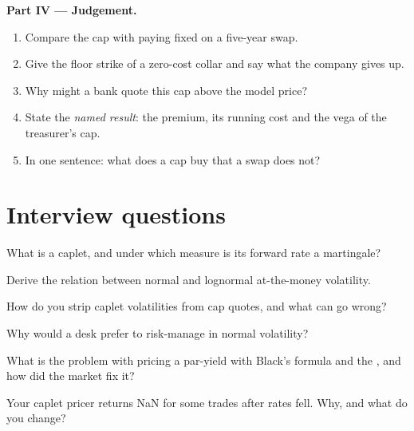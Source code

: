 \begin{problem}
\medskip\noindent\textbf{Part IV --- Judgement.}
\begin{enumerate}[resume]
\item Compare the cap with paying fixed on a five-year swap.
\item Give the floor strike of a zero-cost collar and say what the company gives
up.
\item Why might a bank quote this cap above the model price?
\item State the \emph{named result}: the premium, its running cost and the vega
of the treasurer's cap.
\item In one sentence: what does a cap buy that a swap does not?
\end{enumerate}
\end{problem}

\section{Interview questions}

\begin{interviewq}\label{iq:rc:vanilla-rates-options:1}
What is a caplet, and under which measure is its forward rate a martingale?
\end{interviewq}

\begin{interviewq}\label{iq:rc:vanilla-rates-options:2}
Derive the relation between normal and lognormal at-the-money volatility.
\end{interviewq}

\begin{interviewq}\label{iq:rc:vanilla-rates-options:3}
How do you strip caplet volatilities from cap quotes, and what can go wrong?
\end{interviewq}

\begin{interviewq}\label{iq:rc:vanilla-rates-options:4}
Why would a desk prefer to risk-manage in normal volatility?
\end{interviewq}

\begin{interviewq}\label{iq:rc:vanilla-rates-options:5}
What is the problem with pricing a par-yield  with Black's
formula and the , and how did the market fix it?
\end{interviewq}

\begin{interviewq}\label{iq:rc:vanilla-rates-options:6}
Your caplet pricer returns NaN for some trades after rates fell. Why, and what
do you change?
\end{interviewq}
